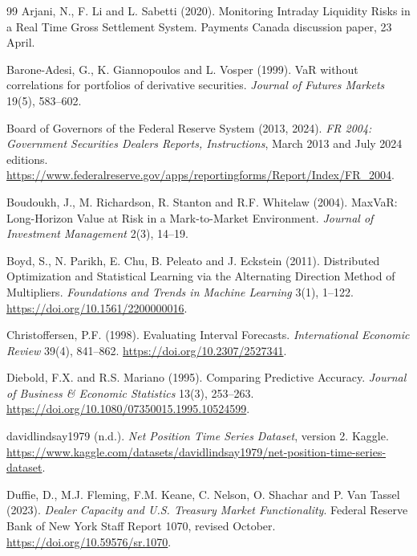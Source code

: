 \begingroup\small
\setlength{\bibsep}{1.5pt}
\begin{thebibliography}{99}
 Arjani, N., F. Li and L. Sabetti (2020).
Monitoring Intraday Liquidity Risks in a Real Time Gross Settlement System. Payments Canada discussion paper, 23 April.

 Barone-Adesi, G., K. Giannopoulos and L. Vosper (1999).
VaR without correlations for portfolios of derivative securities. \emph{Journal of Futures Markets} 19(5), 583--602.

 Board of Governors of the Federal Reserve System (2013, 2024).
\emph{FR 2004: Government Securities Dealers Reports, Instructions}, March 2013 and July 2024 editions.
\url{https://www.federalreserve.gov/apps/reportingforms/Report/Index/FR_2004}.

 Boudoukh, J., M. Richardson, R. Stanton and R.F. Whitelaw (2004).
MaxVaR: Long-Horizon Value at Risk in a Mark-to-Market Environment. \emph{Journal of Investment Management} 2(3), 14--19.

 Boyd, S., N. Parikh, E. Chu, B. Peleato and J. Eckstein (2011).
Distributed Optimization and Statistical Learning via the Alternating Direction Method of Multipliers.
\emph{Foundations and Trends in Machine Learning} 3(1), 1--122. \url{https://doi.org/10.1561/2200000016}.

 Christoffersen, P.F. (1998).
Evaluating Interval Forecasts. \emph{International Economic Review} 39(4), 841--862. \url{https://doi.org/10.2307/2527341}.

 Diebold, F.X. and R.S. Mariano (1995).
Comparing Predictive Accuracy. \emph{Journal of Business \& Economic Statistics} 13(3), 253--263. \url{https://doi.org/10.1080/07350015.1995.10524599}.

 davidlindsay1979 (n.d.).
\emph{Net Position Time Series Dataset}, version 2. Kaggle.
\url{https://www.kaggle.com/datasets/davidlindsay1979/net-position-time-series-dataset}.

 Duffie, D., M.J. Fleming, F.M. Keane, C. Nelson, O. Shachar and P. Van Tassel (2023).
\emph{Dealer Capacity and U.S. Treasury Market Functionality}. Federal Reserve Bank of New York Staff Report 1070, revised October.
\url{https://doi.org/10.59576/sr.1070}.


\end{thebibliography}
